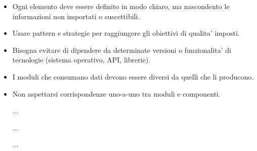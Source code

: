 \begin{itemize}
  \item Ogni elemento deve essere definito in modo chiaro, ma nascondento le informazioni non importati o suscettibili.
  \item Usare pattern e strategie per raggiungere gli obiettivi di qualita' imposti.
  \item Bisogna evitare di dipendere da determinate versioni o funzionalita' di tecnologie (sistema operativo, API, librerie).
  \item I moduli che consumano dati devono essere diversi da quelli che li producono.
  \item Non aspettarsi corrispondenze uno-a-uno tra moduli e componenti.
  \item [...]
  \item [...]
  \item [...]
\end{itemize}
